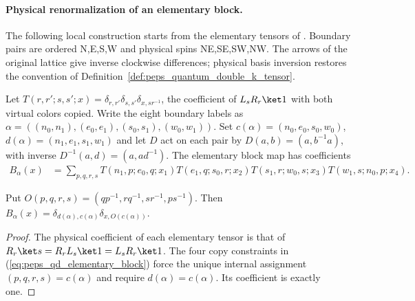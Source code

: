\paragraph{Physical renormalization of an elementary block.}
The following local construction starts from the elementary tensors of
\cite[Section~7.D]{Schuch2010PEPS}. Boundary pairs are ordered N,E,S,W and
physical spins NE,SE,SW,NW. The arrows of the original lattice give inverse
clockwise differences; physical basis inversion restores the convention of
Definition~\ref{def:peps_quantum_double_k_tensor}.

\begin{definition}
    \label{def:peps_qd_elementary_block}
    \leanok
    Let $T(r,r';s,s';x)=\delta_{r,r'}\delta_{s,s'}\delta_{x,sr^{-1}}$,
    the coefficient of $L_sR_r\ket1$ with both virtual colors copied.
    Write the eight boundary labels as
    $\alpha=((n_0,n_1),(e_0,e_1),(s_0,s_1),(w_0,w_1))$.
    Set $c(\alpha)=(n_0,e_0,s_0,w_0)$,
    $d(\alpha)=(n_1,e_1,s_1,w_1)$ and let $D$ act on each pair by
    $D(a,b)=(a,b^{-1}a)$, with inverse $D^{-1}(a,d)=(a,ad^{-1})$.
    The elementary block map has coefficients
    \begin{align}
        B_\alpha(x) & =\sum_{p,q,r,s}
        T(n_1,p;e_0,q;x_1)T(e_1,q;s_0,r;x_2)
        T(s_1,r;w_0,s;x_3)T(w_1,s;n_0,p;x_4).
        \label{eq:peps_qd_elementary_block}
    \end{align}
\end{definition}

\begin{lemma}
    \label{lem:peps_qd_elementary_block}
    \leanok
    Put $O(p,q,r,s)=(qp^{-1},rq^{-1},sr^{-1},ps^{-1})$.
    Then $B_\alpha(x)=\delta_{d(\alpha),c(\alpha)}\delta_{x,O(c(\alpha))}$.
\end{lemma}
\begin{proof}\leanok
    The physical coefficient of each elementary tensor is that of
    $R_r\ket s=R_rL_s\ket1=L_sR_r\ket1$.
    The four copy constraints in (\ref{eq:peps_qd_elementary_block}) force the
    unique internal assignment $(p,q,r,s)=c(\alpha)$ and require
    $d(\alpha)=c(\alpha)$. Its coefficient is exactly one.
\end{proof}

